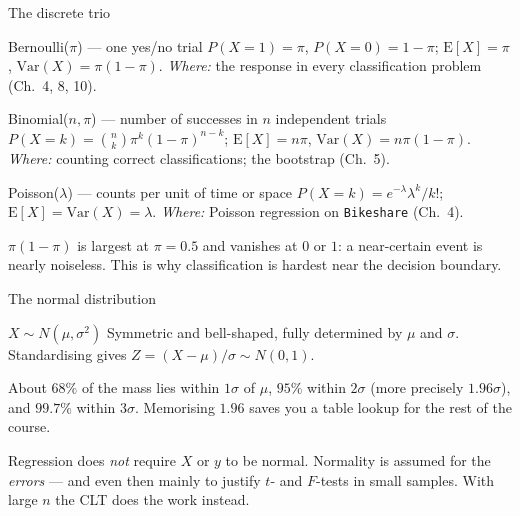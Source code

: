 \documentclass[aspectratio=169,11pt]{beamer}
\begin{document}
\begin{frame}{The discrete trio}
  \footnotesize
  \begin{block}{Bernoulli($\pi$) --- one yes/no trial}
    $P(X=1) = \pi$, $P(X=0) = 1-\pi$; $\mathrm{E}[X] = \pi$,
    $\mathrm{Var}(X) = \pi(1-\pi)$.
    \emph{Where:} the response in every classification problem
    (Ch.\ 4, 8, 10).
  \end{block}
  \begin{block}{Binomial($n,\pi$) --- number of successes in $n$ independent trials}
    $P(X=k) = \binom{n}{k}\pi^k(1-\pi)^{n-k}$; $\mathrm{E}[X] = n\pi$,
    $\mathrm{Var}(X) = n\pi(1-\pi)$.
    \emph{Where:} counting correct classifications; the bootstrap
    (Ch.\ 5).
  \end{block}
  \begin{block}{Poisson($\lambda$) --- counts per unit of time or space}
    $P(X=k) = e^{-\lambda}\lambda^k / k!$; $\mathrm{E}[X] = \mathrm{Var}(X) = \lambda$.
    \emph{Where:} Poisson regression on \texttt{Bikeshare} (Ch.\ 4).
  \end{block}
  \begin{takeaway}
    $\pi(1-\pi)$ is largest at $\pi = 0.5$ and vanishes at $0$ or $1$: a
    near-certain event is nearly noiseless. This is why classification is
    hardest near the decision boundary.
  \end{takeaway}
\end{frame}

\begin{frame}{The normal distribution}
  \begin{block}{$X \sim N(\mu, \sigma^2)$}
    Symmetric and bell-shaped, fully determined by $\mu$ and $\sigma$.
    Standardising gives $Z = (X-\mu)/\sigma \sim N(0,1)$.
  \end{block}
  \begin{takeaway}
    About $68\%$ of the mass lies within $1\sigma$ of $\mu$, $95\%$ within
    $2\sigma$ (more precisely $1.96\sigma$), and $99.7\%$ within $3\sigma$.
    Memorising $1.96$ saves you a table lookup for the rest of the course.
  \end{takeaway}
  \begin{readme}
    Regression does \emph{not} require $X$ or $y$ to be normal. Normality
    is assumed for the \emph{errors} --- and even then mainly to justify
    $t$- and $F$-tests in small samples. With large $n$ the CLT does the
    work instead.
  \end{readme}
\end{frame}
\end{document}
